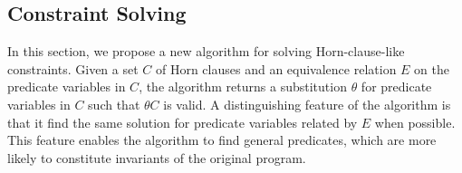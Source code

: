 


\subsection{Constraint Solving}
\label{sec:cs}

In this section, we propose a new algorithm for solving Horn-clause-like 
constraints.  Given a set \(C\) of Horn clauses and an equivalence 
relation \(E\) on the predicate variables in \(C\), the algorithm 
returns a substitution \(\theta\) for predicate variables in \(C\) such 
that \(\theta C\) is valid.  A distinguishing feature of the algorithm 
is that it find the same solution for predicate variables related by 
\(E\) when possible.  This feature enables the algorithm to find general 
predicates, which are more likely to constitute invariants of the 
original program.

